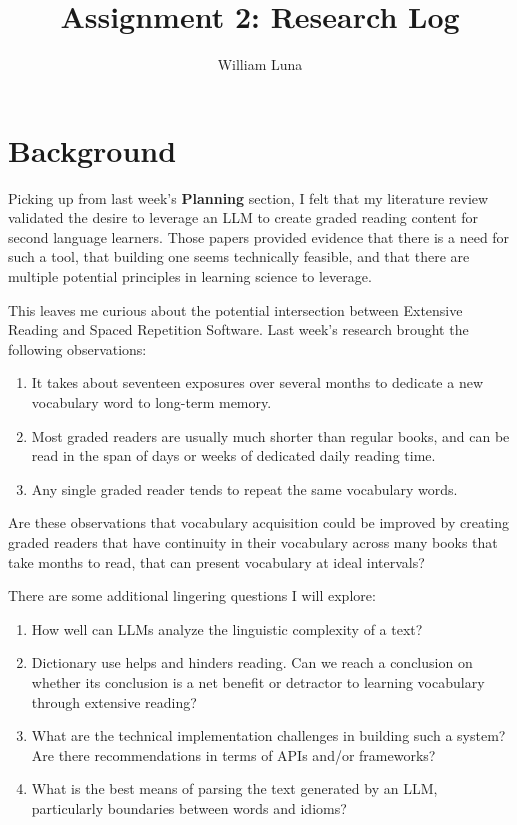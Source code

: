 \documentclass[
	letterpaper, %
]{jdf}
\author{William Luna}
\title{Assignment 2: Research Log}
\begin{document}

\maketitle

\section{Background}
Picking up from last week's \textbf{Planning} section, I felt that my literature review validated the desire to leverage an LLM to create graded reading content for second language learners. Those papers provided evidence that there is a need for such a tool, that building one seems technically feasible, and that there are multiple potential principles in learning science to leverage.

This leaves me curious about the potential intersection between Extensive Reading and Spaced Repetition Software. Last week's research brought the following observations:

\begin{enumerate}
    \item It takes about seventeen exposures over several months to dedicate a new vocabulary word to long-term memory.
    \item Most graded readers are usually much shorter than regular books, and can be read in the span of days or weeks of dedicated daily reading time.
    \item Any single graded reader tends to repeat the same vocabulary words.
\end{enumerate}

Are these observations that vocabulary acquisition could be improved by creating graded readers that have continuity in their vocabulary across many books that take months to read, that can present vocabulary at ideal intervals?

There are some additional lingering questions I will explore:

\begin{enumerate}
    \item How well can LLMs analyze the linguistic complexity of a text?
    \item Dictionary use helps and hinders reading. Can we reach a conclusion on whether its conclusion is a net benefit or detractor to learning vocabulary through extensive reading?
    \item What are the technical implementation challenges in building such a system? Are there recommendations in terms of APIs and/or frameworks?
    \item What is the best means of parsing the text generated by an LLM, particularly boundaries between words and idioms?
\end{enumerate}
\end{document}
